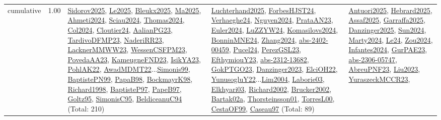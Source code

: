 {\begin{longtable}{p{3cm}r>{\raggedright\arraybackslash}p{6cm}>{\raggedright\arraybackslash}p{6cm}>{\raggedright\arraybackslash}p{8cm}}
\index{cumulative}\index{Constraints!cumulative}cumulative &  1.00 & \hyperref[detail:Sidorov2025]{Sidorov2025}, \hyperref[detail:Le2025]{Le2025}, \hyperref[detail:Bleukx2025]{Bleukx2025}, \hyperref[detail:Ma2025]{Ma2025}, \hyperref[detail:Ahmeti2024]{Ahmeti2024}, \hyperref[detail:Sciau2024]{Sciau2024}, \hyperref[detail:Thomas2024]{Thomas2024}, \hyperref[detail:Col2024]{Col2024}, \hyperref[detail:Cloutier24]{Cloutier24}, \hyperref[detail:AalianPG23]{AalianPG23}, \hyperref[detail:TardivoDFMP23]{TardivoDFMP23}, \hyperref[detail:NaderiRR23]{NaderiRR23}, \hyperref[detail:LacknerMMWW23]{LacknerMMWW23}, \hyperref[detail:WessenCSFPM23]{WessenCSFPM23}, \hyperref[detail:PovedaAA23]{PovedaAA23}, \hyperref[detail:KameugneFND23]{KameugneFND23}, \hyperref[detail:IsikYA23]{IsikYA23}, \hyperref[detail:PohlAK22]{PohlAK22}, \hyperref[detail:AwadMDMT22]{AwadMDMT22}...\hyperref[detail:Simonis99]{Simonis99}, \hyperref[detail:BaptistePN99]{BaptistePN99}, \hyperref[detail:PapaB98]{PapaB98}, \hyperref[detail:BockmayrK98]{BockmayrK98}, \hyperref[detail:Richard1998]{Richard1998}, \hyperref[detail:BaptisteP97]{BaptisteP97}, \hyperref[detail:PapeB97]{PapeB97}, \hyperref[detail:Goltz95]{Goltz95}, \hyperref[detail:SimonisC95]{SimonisC95}, \hyperref[detail:BeldiceanuC94]{BeldiceanuC94} (Total: 210) & \hyperref[detail:Luchterhand2025]{Luchterhand2025}, \hyperref[detail:ForbesHJST24]{ForbesHJST24}, \hyperref[detail:Verhaeghe24]{Verhaeghe24}, \hyperref[detail:Nguyen2024]{Nguyen2024}, \hyperref[detail:PrataAN23]{PrataAN23}, \hyperref[detail:Euler2024]{Euler2024}, \hyperref[detail:LuZZYW24]{LuZZYW24}, \hyperref[detail:Komasilovs2024]{Komasilovs2024}, \hyperref[detail:BonninMNE24]{BonninMNE24}, \hyperref[detail:Zhang2024]{Zhang2024}, \hyperref[detail:abs-2402-00459]{abs-2402-00459}, \hyperref[detail:Pucel24]{Pucel24}, \hyperref[detail:PerezGSL23]{PerezGSL23}, \hyperref[detail:EfthymiouY23]{EfthymiouY23}, \hyperref[detail:abs-2312-13682]{abs-2312-13682}, \hyperref[detail:GokPTGO23]{GokPTGO23}, \hyperref[detail:Danzinger2023]{Danzinger2023}, \hyperref[detail:ElciOH22]{ElciOH22}, \hyperref[detail:YunusogluY22]{YunusogluY22}...\hyperref[detail:Lim2004]{Lim2004}, \hyperref[detail:Laborie03]{Laborie03}, \hyperref[detail:Elkhyari03]{Elkhyari03}, \hyperref[detail:Richard2002]{Richard2002}, \hyperref[detail:Brucker2002]{Brucker2002}, \hyperref[detail:Bartak02a]{Bartak02a}, \hyperref[detail:Thorsteinsson01]{Thorsteinsson01}, \hyperref[detail:TorresL00]{TorresL00}, \hyperref[detail:CestaOF99]{CestaOF99}, \hyperref[detail:Caseau97]{Caseau97} (Total: 89) & \hyperref[detail:Antuori2025]{Antuori2025}, \hyperref[detail:Hebrard2025]{Hebrard2025}, \hyperref[detail:Assaf2025]{Assaf2025}, \hyperref[detail:Garraffa2025]{Garraffa2025}, \hyperref[detail:Danzinger2025]{Danzinger2025}, \hyperref[detail:Sun2024]{Sun2024}, \hyperref[detail:Marty2024]{Marty2024}, \hyperref[detail:Le24]{Le24}, \hyperref[detail:Zou2024]{Zou2024}, \hyperref[detail:Infantes2024]{Infantes2024}, \hyperref[detail:GurPAE23]{GurPAE23}, \hyperref[detail:abs-2306-05747]{abs-2306-05747}, \hyperref[detail:AbreuPNF23]{AbreuPNF23}, \hyperref[detail:Liu2023]{Liu2023}, \hyperref[detail:YuraszeckMCCR23]{YuraszeckMCCR23}, 
\end{longtable}}
